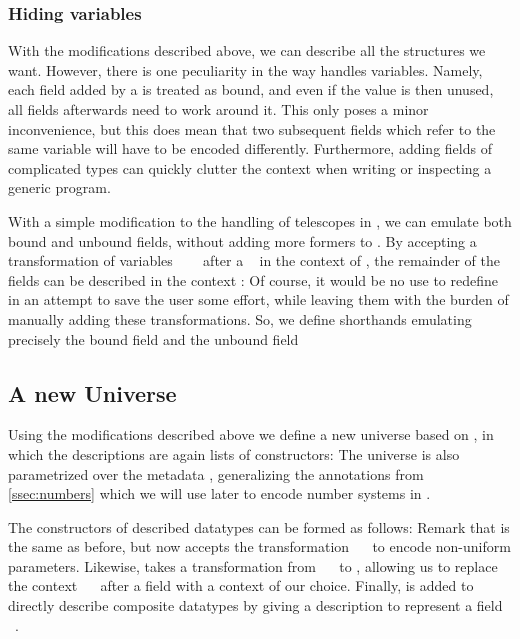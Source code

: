 \subsubsection{Hiding variables}
With the modifications described above, we can describe all the structures we want. However, there is one peculiarity in the way  handles variables. Namely, each field added by a  is treated as bound, and even if the value is then unused, all fields afterwards need to work around it. This only poses a minor inconvenience, but this does mean that two subsequent fields which refer to the same variable will have to be encoded differently. Furthermore, adding fields of complicated types can quickly clutter the context when writing or inspecting a generic program.

With a simple modification to the handling of telescopes in , we can emulate both bound and unbound fields, without adding more formers to . By accepting a transformation of variables \ \ \  after a \  in the context of , the remainder of the fields can be described in the context :
Of course, it would be no use to redefine  in an attempt to save the user some effort, while leaving them with the burden of manually adding these transformations. So, we define shorthands emulating precisely the bound field
and the unbound field


\subsection{A new Universe}\label{ssec:desc}
Using the modifications described above we define a new universe based on , in which the descriptions are again lists of constructors:
The universe  is also parametrized over the metadata , generalizing the annotations from \autoref{ssec:numbers} which we will use later to encode number systems in .

The constructors of described datatypes can be formed as follows:
Remark that  is the same as before, but  now accepts the transformation \ \  to encode non-uniform parameters. Likewise,  takes a transformation  from \ \  to , allowing us to replace the context \ \  after a field with a context  of our choice. Finally,  is added to directly describe composite datatypes by giving a description  to represent a field \ .

